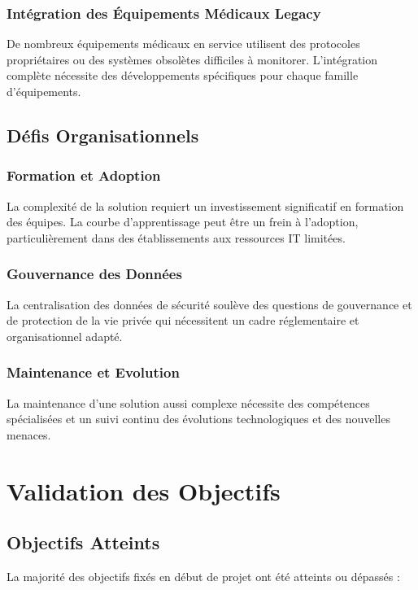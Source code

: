\subsubsection{Intégration des Équipements Médicaux Legacy}
De nombreux équipements médicaux en service utilisent des protocoles propriétaires ou des systèmes obsolètes difficiles à monitorer. L'intégration complète nécessite des développements spécifiques pour chaque famille d'équipements.

\subsection{Défis Organisationnels}

\subsubsection{Formation et Adoption}
La complexité de la solution requiert un investissement significatif en formation des équipes. La courbe d'apprentissage peut être un frein à l'adoption, particulièrement dans des établissements aux ressources IT limitées.

\subsubsection{Gouvernance des Données}
La centralisation des données de sécurité soulève des questions de gouvernance et de protection de la vie privée qui nécessitent un cadre réglementaire et organisationnel adapté.

\subsubsection{Maintenance et Evolution}
La maintenance d'une solution aussi complexe nécessite des compétences spécialisées et un suivi continu des évolutions technologiques et des nouvelles menaces.

\section{Validation des Objectifs}

\subsection{Objectifs Atteints}

La majorité des objectifs fixés en début de projet ont été atteints ou dépassés :

